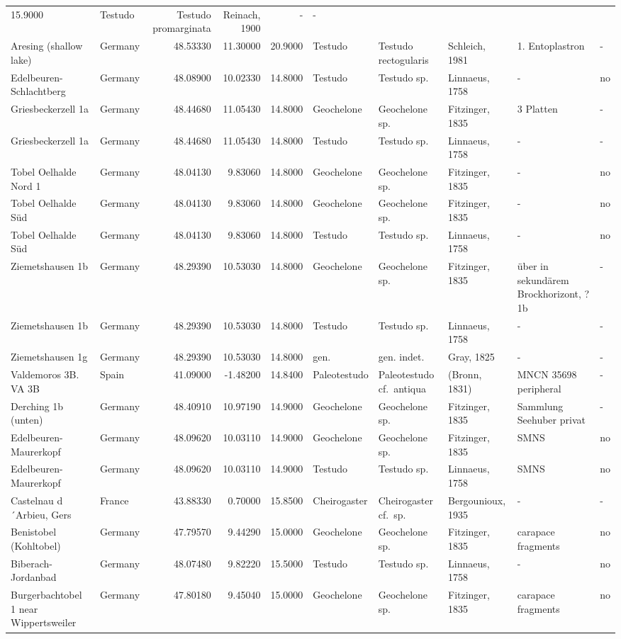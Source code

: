\documentclass[]{article}
\begin{document}
\begin{longtable}[]{@{}llrrrlllll@{}}
15.9000 & Testudo & Testudo promarginata & Reinach, 1900 & - &
-\tabularnewline
Aresing (shallow lake) & Germany & 48.53330 & 11.30000 & 20.9000 &
Testudo & Testudo rectogularis & Schleich, 1981 & 1. Entoplastron &
-\tabularnewline
Edelbeuren-Schlachtberg & Germany & 48.08900 & 10.02330 & 14.8000 &
Testudo & Testudo sp. & Linnaeus, 1758 & - & no\tabularnewline
Griesbeckerzell 1a & Germany & 48.44680 & 11.05430 & 14.8000 &
Geochelone & Geochelone sp. & Fitzinger, 1835 & 3 Platten &
-\tabularnewline
Griesbeckerzell 1a & Germany & 48.44680 & 11.05430 & 14.8000 & Testudo &
Testudo sp. & Linnaeus, 1758 & - & -\tabularnewline
Tobel Oelhalde Nord 1 & Germany & 48.04130 & 9.83060 & 14.8000 &
Geochelone & Geochelone sp. & Fitzinger, 1835 & - & no\tabularnewline
Tobel Oelhalde Süd & Germany & 48.04130 & 9.83060 & 14.8000 & Geochelone
& Geochelone sp. & Fitzinger, 1835 & - & no\tabularnewline
Tobel Oelhalde Süd & Germany & 48.04130 & 9.83060 & 14.8000 & Testudo &
Testudo sp. & Linnaeus, 1758 & - & no\tabularnewline
Ziemetshausen 1b & Germany & 48.29390 & 10.53030 & 14.8000 & Geochelone
& Geochelone sp. & Fitzinger, 1835 & über in sekundärem Brockhorizont,
?1b & -\tabularnewline
Ziemetshausen 1b & Germany & 48.29390 & 10.53030 & 14.8000 & Testudo &
Testudo sp. & Linnaeus, 1758 & - & -\tabularnewline
Ziemetshausen 1g & Germany & 48.29390 & 10.53030 & 14.8000 & gen. & gen.
indet. & Gray, 1825 & - & -\tabularnewline
Valdemoros 3B. VA 3B & Spain & 41.09000 & -1.48200 & 14.8400 &
Paleotestudo & Paleotestudo cf.~antiqua & (Bronn, 1831) & MNCN 35698
peripheral & -\tabularnewline
Derching 1b (unten) & Germany & 48.40910 & 10.97190 & 14.9000 &
Geochelone & Geochelone sp. & Fitzinger, 1835 & Sammlung Seehuber privat
& -\tabularnewline
Edelbeuren-Maurerkopf & Germany & 48.09620 & 10.03110 & 14.9000 &
Geochelone & Geochelone sp. & Fitzinger, 1835 & SMNS & no\tabularnewline
Edelbeuren-Maurerkopf & Germany & 48.09620 & 10.03110 & 14.9000 &
Testudo & Testudo sp. & Linnaeus, 1758 & SMNS & no\tabularnewline
Castelnau d´Arbieu, Gers & France & 43.88330 & 0.70000 & 15.8500 &
Cheirogaster & Cheirogaster cf.~sp. & Bergounioux, 1935 & - &
-\tabularnewline
Benistobel (Kohltobel) & Germany & 47.79570 & 9.44290 & 15.0000 &
Geochelone & Geochelone sp. & Fitzinger, 1835 & carapace fragments &
no\tabularnewline
Biberach-Jordanbad & Germany & 48.07480 & 9.82220 & 15.5000 & Testudo &
Testudo sp. & Linnaeus, 1758 & - & no\tabularnewline
Burgerbachtobel 1 near Wippertsweiler & Germany & 47.80180 & 9.45040 &
15.0000 & Geochelone & Geochelone sp. & Fitzinger, 1835 & carapace
fragments & no\tabularnewline

\end{longtable}
\end{document}
